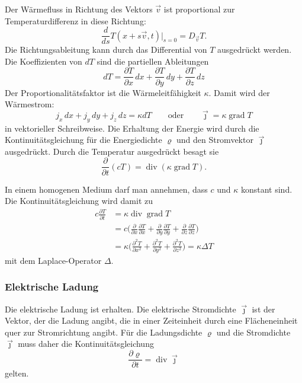 Der Wärmefluss in Richtung des Vektors $\vec{v}$ ist proportional
%
zur Temperaturdifferenz in diese Richtung:
\[
\frac{d}{ds}
T(x+s\vec{v},t)\bigg|_{s=0}
=
D_{\vec{v}} T.
\]
Die Richtungsableitung kann durch das Differential von $T$
ausgedrückt werden.
Die Koeffizienten von $dT$ sind die partiellen Ableitungen
\[
dT
=
\frac{\partial T}{\partial x}\,dx
+
\frac{\partial T}{\partial y}\,dy
+
\frac{\partial T}{\partial z}\,dz
\]
Der Proportionalitätsfaktor ist die Wärmeleitfähigkeit $\kappa$.
Damit wird der Wärmestrom:
\[
j_x\,dx
+
j_y\,dy
+
j_z\,dz
=
\kappa
dT
\qquad\text{oder}\qquad
\vec{\jmath}
=
\kappa
\operatorname{grad} T
\]
in vektorieller Schreibweise.
Die Erhaltung der Energie wird durch die Kontinuitätsgleichung
für die Energiedichte $\varrho$ und den Stromvektor $\vec{\jmath}$
ausgedrückt.
Durch die Temperatur ausgedrückt besagt sie
\[
\frac{\partial }{\partial t}
(cT)
=
\operatorname{div}(\kappa\operatorname{grad}T).
\]

In einem homogenen Medium darf man annehmen, dass $c$ und $\kappa$ konstant
sind.
Die Kontinuitätsgleichung wird damit zu
\begin{align*}
c\frac{\partial T}{\partial t}
&=
\kappa
\operatorname{div}\operatorname{grad}T
\\
&=
c
\biggl(
\frac{\partial}{\partial x}
\frac{\partial T}{\partial x}
+
\frac{\partial}{\partial y}
\frac{\partial T}{\partial y}
+
\frac{\partial}{\partial z}
\frac{\partial T}{\partial z}
\biggr)
\\
&=
\kappa
\biggl(
\frac{\partial^2 T}{\partial x^2}
+
\frac{\partial^2 T}{\partial y^2}
+
\frac{\partial^2 T}{\partial z^2}
\biggr)
=
\kappa \Delta T
\end{align*}
mit dem Laplace-Operator $\Delta$.

%
%
\subsubsection{Elektrische Ladung}
Die elektrische Ladung ist erhalten.
%
%
Die elektrische Stromdichte $\vec{\jmath}$ ist der Vektor, der die Ladung
%
angibt, die in einer Zeiteinheit durch eine Flächeneinheit quer zur
Stromrichtung angibt.
Für die Ladungsdichte $\varrho$ und die Stromdichte $\vec{\jmath}$
muss daher die Kontinuitätsgleichung
\[
\frac{\partial\varrho}{\partial t}
=
\operatorname{div} \vec{\jmath}
\]
gelten.

%
%
